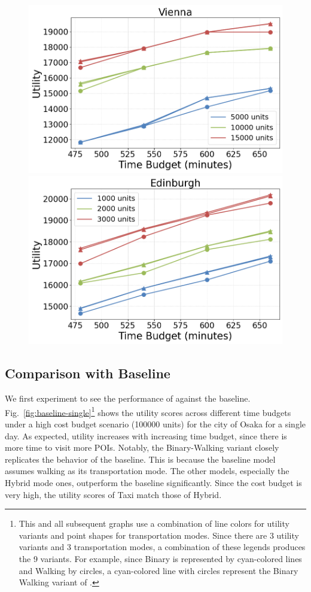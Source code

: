 \begin{figure}[t]
    \includegraphics[width=0.65\columnwidth]{plots/exp1-vienna.png}
    \includegraphics[width=0.65\columnwidth]{plots/exp1-edinburgh.png}
    \label{fig:cities}
\end{figure}

\subsection{Comparison with Baseline} \label{sec:exp baseline comparison}

We first experiment to see the performance of \trip against the baseline.
Fig.~\ref{fig:baseline-single}\footnote{This and all subsequent graphs use a combination of line colors for utility variants and point shapes for transportation modes. Since there are 3 utility variants and 3 transportation modes, a combination of these legends produces the 9 \trip variants. For example, since Binary is represented by cyan-colored lines and Walking by circles, a cyan-colored line with circles represent the Binary Walking variant of \trip.}
shows the utility scores across different time budgets under a high cost budget scenario (100000 units) for the city of Osaka for a single day.
As expected, utility increases with increasing time budget, since there is more time to visit more POIs.
Notably, the \trip Binary-Walking variant closely replicates the behavior of the baseline. This is because the baseline model assumes walking as its transportation mode.  The other models, especially the Hybrid mode ones, outperform the baseline significantly.
Since the cost budget is very high, the utility scores of Taxi match those of Hybrid.

